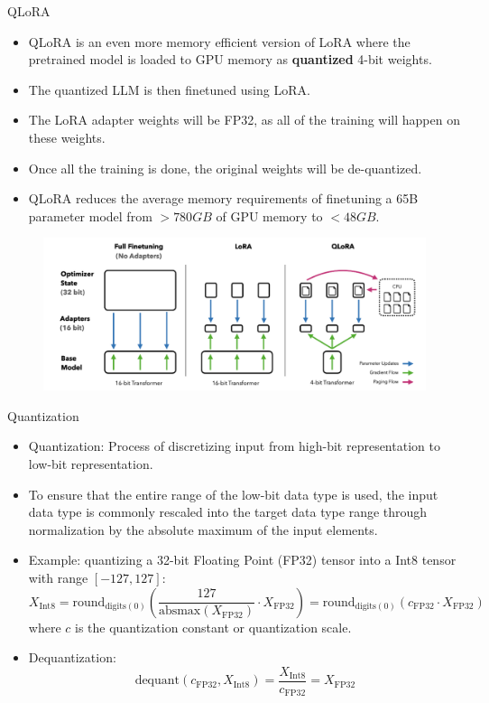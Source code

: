 \documentclass[handout]{beamer}
\begin{document}
\begin{frame}{QLoRA}
\begin{scriptsize}
\begin{itemize}
\item QLoRA is an even more memory efficient version of LoRA where the pretrained model is loaded to GPU memory as \textbf{quantized} 4-bit weights.
\item The quantized LLM is then finetuned using LoRA.
\item The LoRA adapter weights will be FP32, as all of the training will happen on these weights.
\item Once all the training is done, the original weights will be de-quantized.
\item QLoRA reduces the average memory requirements of finetuning a 65B parameter model from $>780GB$ of GPU memory to $<48GB$.
\end{itemize}
\end{scriptsize}
     \begin{figure}[h]
	\includegraphics[scale = 0.22]{pics/qlora.png}
\end{figure}

\end{frame}

\begin{frame}{Quantization}
\scriptsize
    \begin{itemize}
        \item Quantization: Process of discretizing input from high-bit representation to low-bit representation.
      \item To ensure that the entire range of the low-bit data type is used, the input data type is commonly rescaled into the target data type range through normalization by the absolute maximum of the input elements.
        \item Example: quantizing a 32-bit Floating Point (FP32) tensor into a Int8 tensor with range $[-127, 127]$:
        \[X_{\text{Int8}} = \text{round}_{\text{digits}(0)}\left(\frac{127}{\text{absmax}(X_{\text{FP32}})} \cdot X_{\text{FP32}}\right) = \text{round}_{\text{digits}(0)}\left(c_{\text{FP32}} \cdot X_{\text{FP32}}\right)\]
        where $c$ is the quantization constant or quantization scale.
        \item Dequantization:
    \[\text{dequant}(c_{\text{FP32}}, X_{\text{Int8}}) = \frac{X_{\text{Int8}}}{ c_{\text{FP32}}} = X_{\text{FP32}}\]
    \end{itemize}
\end{frame}
\end{document}
